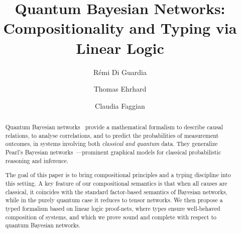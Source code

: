 \documentclass[a4paper,UKenglish,cleveref,thm-restate,pdfa]{lipics-v2021}
\title{Quantum Bayesian Networks:\texorpdfstring{\\}{ }Compositionality and Typing via Linear Logic}
\author{R{\'e}mi {Di Guardia}}{Université Paris Cité, CNRS, Inria, IRIF, F-75013, Paris, France \and \url{https://remidig.github.io/}}{remi.di.guardia@ens-lyon.org}{https://orcid.org/0009-0004-8632-108X}{}
\author{Thomas Ehrhard}{Université Paris Cité, CNRS, IRIF, F-75013, Paris, France}{ehrhard@irif.fr}{https://orcid.org/0000-0001-5231-5504}{}
\author{Claudia Faggian}{Université Paris Cité, CNRS, IRIF, F-75013, Paris, France}{faggian@irif.fr}{}{}
\begin{document}
	
\maketitle
	
\begin{abstract}
Quantum Bayesian networks~\cite{GBN2014} provide a mathematical formalism to describe causal relations, to analyse correlations, and to predict the probabilities of measurement outcomes, in systems involving both \emph{classical and quantum} data.
They generalize Pearl's Bayesian networks~\cite{Pearl_book}---prominent graphical models for classical probabilistic reasoning and inference.

The goal of this paper is to bring compositional principles and a typing discipline into this setting. 
A key feature of our compositional semantics is that when all causes are classical, it coincides with the standard factor-based semantics of Bayesian networks, while in the purely quantum case it reduces to tensor networks.
We then propose a typed formalism based on linear logic proof-nets, where types ensure well-behaved composition of systems, and which we prove sound and complete with respect to quantum Bayesian networks.
\end{abstract}










\newpage


\end{document}
